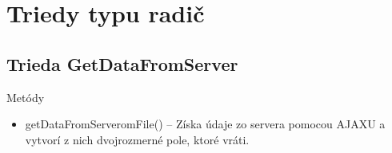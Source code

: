 \documentclass[12pt,a4paper]{report}
\begin{document}
\section[Triedy typu radič]{\rmfamily\bfseries
	Triedy typu radič}

\subsection[Trieda GetDataFromServer]{\rmfamily\bfseries
	Trieda GetDataFromServer}
Metódy
\begin{itemize}
	\item getDataFromServeromFile() – Získa údaje zo servera pomocou AJAXU a vytvorí z nich dvojrozmerné pole, ktoré vráti.
\end{itemize}
\end{document}
